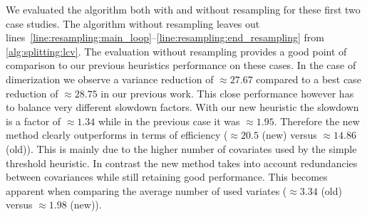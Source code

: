 We evaluated the algorithm both with and without resampling for these first two case studies.
The algorithm without resampling  leaves out lines~\ref{line:resampling:main_loop}--\ref{line:resampling:end_resampling} from \autoref{alg:splitting:lcv}.
The evaluation without resampling provides a good point of comparison to our previous heuristics performance on these cases.
In the case of dimerization we observe a variance reduction of $\approx 27.67$ compared to a best case reduction of $\approx 28.75$ in our previous work.
This close performance however has to balance very different slowdown factors. With our new heuristic the slowdown is a factor of $\approx 1.34$ while in the previous case it was $\approx 1.95$.
Therefore the new method clearly outperforms in terms of efficiency ($\approx 20.5$ (new) versus $\approx 14.86$ (old)).
This is mainly due to the higher number of covariates used by the simple threshold heuristic.
In contrast the new method takes into account redundancies between covariances while still retaining good performance.
This becomes apparent when comparing the average number of used variates ($\approx 3.34$ (old) versus $\approx 1.98$ (new)).

